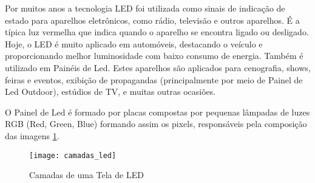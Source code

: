 Por muitos anos a tecnologia LED foi utilizada como sinais de indicação de estado para aparelhos eletrônicos, como rádio, televisão e outros aparelhos. É a típica luz vermelha que indica quando o aparelho se encontra ligado ou desligado. Hoje, o LED é muito aplicado em automóveis, destacando o veículo e proporcionando melhor luminosidade com baixo consumo de energia. Também é utilizado em Painéis de Led. Estes aparelhos são aplicados para cenografia, shows, feiras e eventos, exibição de propagandas (principalmente por meio de Painel de Led Outdoor), estúdios de TV, e muitas outras ocasiões.

O Painel de Led é formado por placas compostas por pequenas lâmpadas de luzes RGB (Red, Green, Blue) formando assim os pixels, responsáveis pela composição das imagens \ref{fig:camadas_led}.

\begin{figure}[!h]
  \centering
  \texttt{[image: camadas\_led]} 
  \caption{Camadas de uma Tela de LED}
  \label{fig:camadas_led} 
\end{figure}





















